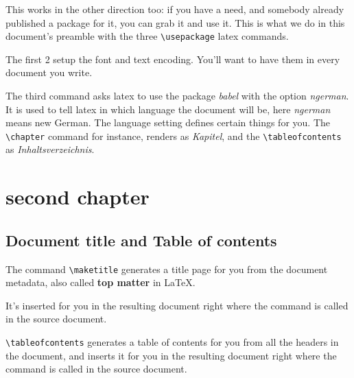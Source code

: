 \documentclass[a4paper]{book}
\begin{document}
This works in the other direction too: if you have a need, and somebody already
published a package for it, you can grab it and use it.
This is what we do in this document's preamble with the three \verb`\usepackage`
latex commands.

The first 2 setup the font and text encoding. You'll want to have them in every
document you write.

The third command asks latex to use the package \textit{babel} with the option
\textit{ngerman}.
It is used to tell latex in which language the document will be, here
\textit{ngerman} means new German. The language setting defines certain things
for you.
The \verb`\chapter` command for instance, renders as \textit{Kapitel}, and the
\verb`\tableofcontents` as \textit{Inhaltsverzeichnis}.


\chapter{second chapter}


\section{Document title and Table of contents}

The command \verb`\maketitle` generates a title page for you from the document
metadata, also called \textbf{top matter} in \LaTeX.

It's inserted for you in the resulting document right where the command is
called in the source document.

\verb`\tableofcontents` generates a table of contents for you from all the
headers in the document, and inserts it for you in the resulting document right
where the command is called in the source document.
\end{document}
